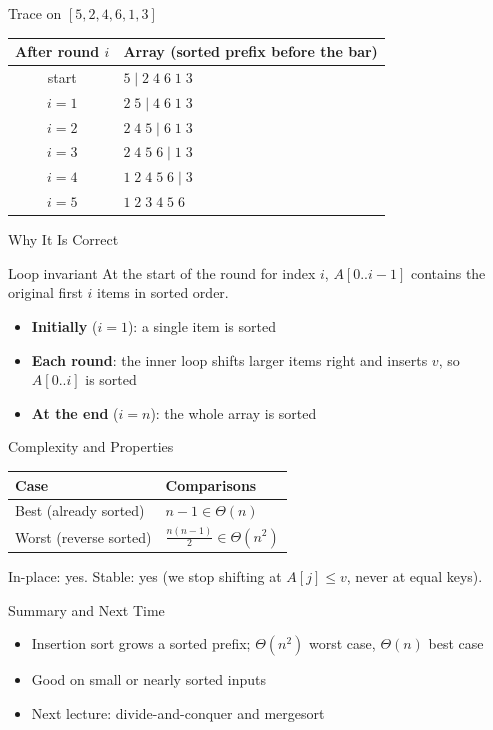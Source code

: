 \documentclass[aspectratio=169,11pt]{beamer}
\begin{document}
\begin{frame}{Trace on $[5, 2, 4, 6, 1, 3]$}
  \begin{center}
  \begin{tabular}{cl}
    \hline
    After round $i$ & Array (sorted prefix before the bar) \\
    \hline
    start & $5 \mid 2\; 4\; 6\; 1\; 3$ \\
    $i=1$ & $2\; 5 \mid 4\; 6\; 1\; 3$ \\
    $i=2$ & $2\; 4\; 5 \mid 6\; 1\; 3$ \\
    $i=3$ & $2\; 4\; 5\; 6 \mid 1\; 3$ \\
    $i=4$ & $1\; 2\; 4\; 5\; 6 \mid 3$ \\
    $i=5$ & $1\; 2\; 3\; 4\; 5\; 6$ \\
    \hline
  \end{tabular}
  \end{center}
\end{frame}

\begin{frame}{Why It Is Correct}
  \begin{block}{Loop invariant}
    At the start of the round for index $i$, $A[0..i-1]$ contains the original first $i$
    items in sorted order.
  \end{block}
  \begin{itemize}
    \item \textbf{Initially} ($i = 1$): a single item is sorted
    \item \textbf{Each round}: the inner loop shifts larger items right and inserts $v$, so $A[0..i]$ is sorted
    \item \textbf{At the end} ($i = n$): the whole array is sorted
  \end{itemize}
\end{frame}

\begin{frame}{Complexity and Properties}
  \begin{center}
  \begin{tabular}{ll}
    \hline
    Case & Comparisons \\
    \hline
    Best (already sorted) & $n - 1 \in \Theta(n)$ \\
    Worst (reverse sorted) & $\frac{n(n-1)}{2} \in \Theta(n^2)$ \\
    \hline
  \end{tabular}
  \end{center}
  \medskip
  In-place: yes. Stable: yes (we stop shifting at $A[j] \le v$, never at equal keys).
\end{frame}

\begin{frame}{Summary and Next Time}
  \begin{itemize}
    \item Insertion sort grows a sorted prefix; $\Theta(n^2)$ worst case, $\Theta(n)$ best case
    \item Good on small or nearly sorted inputs
    \item Next lecture: divide-and-conquer and mergesort
  \end{itemize}
\end{frame}
\end{document}
